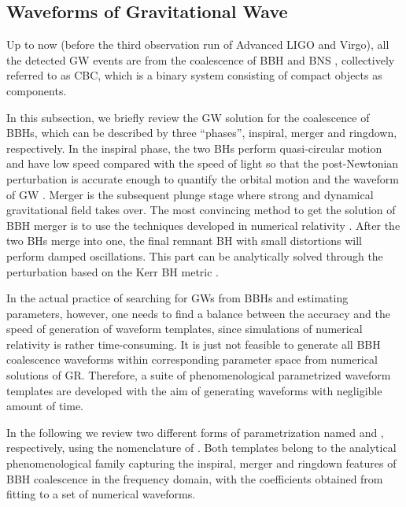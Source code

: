 \subsection{Waveforms of Gravitational Wave}\label{subsec:waveform}

Up to now (before the third observation run of Advanced LIGO and Virgo), all the detected \ac{GW} events are from the coalescence of \ac{BBH} and \ac{BNS} , collectively referred to as \ac{CBC}, which is a binary system consisting of compact objects as components.

In this subsection, we briefly review the \ac{GW} solution for the coalescence of \acp{BBH}, which can be described by three ``phases'', inspiral, merger and ringdown, respectively.
In the inspiral phase, the two \acp{BH} perform quasi-circular motion and have low speed compared with the speed of light so that the post-Newtonian perturbation is accurate enough to quantify the orbital motion and the waveform of \ac{GW} \cite{PNLivingReview}.
Merger is the subsequent plunge stage where strong and dynamical gravitational field takes over.
The most convincing method to get the solution of \ac{BBH} merger is to use the techniques developed in numerical relativity \cite{NRLivingReview}.
After the two \acp{BH} merge into one, the final remnant \ac{BH} with small distortions will perform damped oscillations.
This part can be analytically solved through the perturbation based on the Kerr \ac{BH} metric \cite{BHPurLivingReview}.

In the actual practice of searching for \acp{GW} from \acp{BBH} and estimating parameters, however, one needs to find a balance between the accuracy and the speed of generation of waveform templates, since simulations of numerical relativity is rather time-consuming.
It is just not feasible to generate all \ac{BBH} coalescence waveforms within corresponding parameter space from numerical solutions of \ac{GR}.
Therefore, a suite of phenomenological parametrized waveform templates are developed with the aim of generating waveforms with negligible amount of time. 

In the following we review two different forms of parametrization named {\IMRB} and {\IMRD}, respectively, using the nomenclature of {\LAL} \cite{lalsuite}.
Both templates belong to the analytical phenomenological family capturing the inspiral, merger and ringdown features of \ac{BBH} coalescence in the frequency domain, with the coefficients obtained from fitting to a set of numerical waveforms.

\subsubsection{{\IMRB}}

